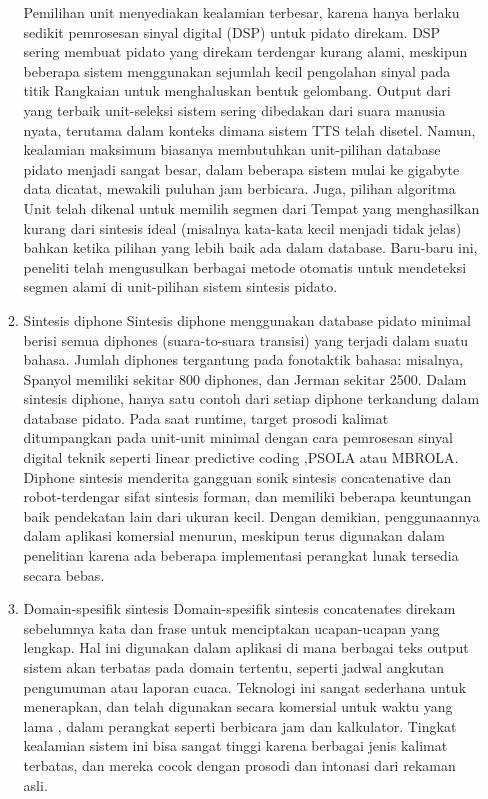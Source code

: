 \begin{enumerate}
\begin{enumerate}
Pemilihan unit menyediakan kealamian terbesar, karena hanya berlaku sedikit pemrosesan sinyal digital (DSP) untuk pidato direkam. DSP sering membuat pidato yang direkam terdengar kurang alami, meskipun beberapa sistem menggunakan sejumlah kecil pengolahan sinyal pada titik Rangkaian untuk menghaluskan bentuk gelombang. Output dari yang terbaik unit-seleksi sistem sering dibedakan dari suara manusia nyata, terutama dalam konteks dimana sistem TTS telah disetel. Namun, kealamian maksimum biasanya membutuhkan unit-pilihan database pidato menjadi sangat besar, dalam beberapa sistem mulai ke gigabyte data dicatat, mewakili puluhan jam berbicara.  Juga, pilihan algoritma Unit telah dikenal untuk memilih segmen dari Tempat yang menghasilkan kurang dari sintesis ideal (misalnya kata-kata kecil menjadi tidak jelas) bahkan ketika pilihan yang lebih baik ada dalam database. Baru-baru ini, peneliti telah mengusulkan berbagai metode otomatis untuk mendeteksi segmen alami di unit-pilihan sistem sintesis pidato.
\item Sintesis diphone
Sintesis diphone menggunakan database pidato minimal berisi semua diphones (suara-to-suara transisi) yang terjadi dalam suatu bahasa. Jumlah diphones tergantung pada fonotaktik bahasa: misalnya, Spanyol memiliki sekitar 800 diphones, dan Jerman sekitar 2500. Dalam sintesis diphone, hanya satu contoh dari setiap diphone terkandung dalam database pidato. Pada saat runtime, target prosodi kalimat ditumpangkan pada unit-unit minimal dengan cara pemrosesan sinyal digital teknik seperti linear predictive coding ,PSOLA atau MBROLA. Diphone sintesis menderita gangguan sonik sintesis concatenative dan robot-terdengar sifat sintesis forman, dan memiliki beberapa keuntungan baik pendekatan lain dari ukuran kecil. Dengan demikian, penggunaannya dalam aplikasi komersial menurun, meskipun terus digunakan dalam penelitian karena ada beberapa implementasi perangkat lunak tersedia secara bebas.
\item Domain-spesifik sintesis
Domain-spesifik sintesis concatenates direkam sebelumnya kata dan frase untuk menciptakan ucapan-ucapan yang lengkap. Hal ini digunakan dalam aplikasi di mana berbagai teks output sistem akan terbatas pada domain tertentu, seperti jadwal angkutan pengumuman atau laporan cuaca.  Teknologi ini sangat sederhana untuk menerapkan, dan telah digunakan secara komersial untuk waktu yang lama , dalam perangkat seperti berbicara jam dan kalkulator. Tingkat kealamian sistem ini bisa sangat tinggi karena berbagai jenis kalimat terbatas, dan mereka cocok dengan prosodi dan intonasi dari rekaman asli.


\end{enumerate}
\end{enumerate}
